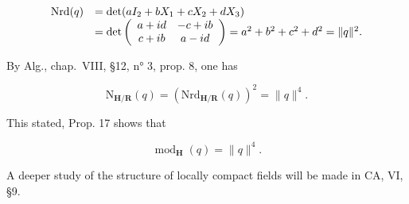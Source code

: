 \[
\begin{array}{r l} \mathrm{Nrd} (q) & = \det (a I _ {2} + b X _ {1} + c X _ {2} + d X _ {3}) \\ & = \det \left( \begin{array}{c c} a + i d & - c + i b \\ c + i b & a - i d \end{array} \right) = a ^ {2} + b ^ {2} + c ^ {2} + d ^ {2} = \| q \| ^ {2}. \end{array}
\]

By Alg., chap.~VIII, §12, n° 3, prop. 8, one has

\[
\mathrm{N} _ {\mathbf {H} / \mathbf {R}} (q) = \left(\mathrm{Nrd} _ {\mathbf {H} / \mathbf {R}} (q)\right) ^ {2} = \| q \| ^ {4}.
\]

This stated, Prop. 17 shows that

\[
\operatorname{mod} _ {\mathbf {H}} (q) = \| q \| ^ {4}.
\]

A deeper study of the structure of locally compact fields will be made in CA, VI, §9.

